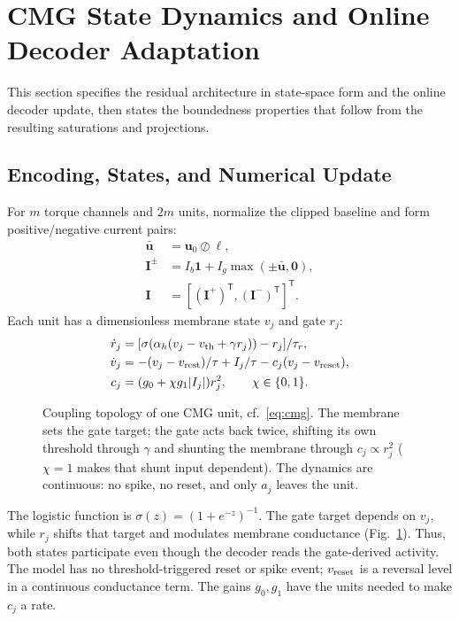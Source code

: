 \documentclass[letterpaper, 10 pt, conference]{ieeeconf}
\newcommand{\T}{^{\mathsf T}}
\begin{document}
\section{CMG State Dynamics and Online Decoder Adaptation}
\label{sec:architecture}
\label{sec:analysis}
This section specifies the residual architecture in state-space form and the online decoder update, then states the boundedness properties that follow from the resulting saturations and projections.
\subsection{Encoding, States, and Numerical Update}

For $m$ torque channels and $2m$ units, normalize the clipped baseline and
form positive/negative current pairs:
\begin{equation}
 \begin{aligned}
 \bar{\bm u}&=\bm u_0\oslash\bm\ell,\\
 \bm I^{\pm}&=I_b\bm1+I_g\max(\pm\bar{\bm u},\bm0),\\
 \bm I&=[(\bm I^+)\T,(\bm I^-)\T]\T.
 \end{aligned}
 \label{eq:encoding}
\end{equation}
Each unit has a dimensionless membrane state $v_j$ and gate $r_j$:
\begin{align}
 \dot r_j&=[\sigma(\alpha_h(v_j-v_{\rm th}+\gamma r_j))-r_j]/\tau_r,\\
 \dot v_j&=-(v_j-v_{\rm rest})/\tau+I_j/\tau-c_j(v_j-v_{\rm reset}),\\
 c_j&=(g_0+\chi g_1|I_j|)r_j^2,\qquad \chi\in\{0,1\}.
 \label{eq:cmg}
\end{align}
\begin{figure}[t]
\centering
\resizebox{0.86\columnwidth}{!}{}
\caption{Coupling topology of one CMG unit, cf.~\eqref{eq:cmg}. The
membrane sets the gate target; the gate acts back twice, shifting its own
threshold through $\gamma$ and shunting the membrane through
$c_j\propto r_j^2$ ($\chi=1$ makes that shunt input dependent). The
dynamics are continuous: no spike, no reset, and only $a_j$ leaves the
unit.}
\label{fig:cmgunit}
\end{figure}
The logistic function is $\sigma(z)=(1+e^{-z})^{-1}$.
The gate target depends on $v_j$, while $r_j$ shifts that target
and modulates membrane conductance (Fig.~\ref{fig:cmgunit}). Thus, both states participate even
though the decoder reads the gate-derived activity. The model has no
threshold-triggered reset or spike event; $v_{\rm reset}$ is a reversal
level in a continuous conductance term. The gains $g_0,g_1$ have the units
needed to make $c_j$ a rate.
\end{document}
